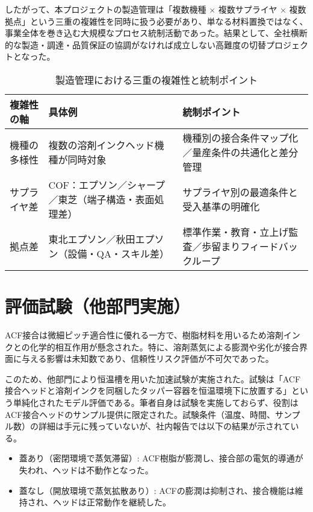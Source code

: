 \documentclass[conference]{IEEEtran}
\begin{document}
したがって、本プロジェクトの製造管理は「複数機種 × 複数サプライヤ × 複数拠点」という三重の複雑性を同時に扱う必要があり、単なる材料置換ではなく、事業全体を巻き込む大規模なプロセス統制活動であった。結果として、全社横断的な製造・調達・品質保証の協調がなければ成立しない高難度の切替プロジェクトとなった。

\begin{table}[t]
\centering
\footnotesize
\caption{製造管理における三重の複雑性と統制ポイント}
\label{tab:complexity}
\renewcommand{\arraystretch}{1.1}
\begin{tabularx}{\columnwidth}{@{}p{2.4cm} Y Y@{}}
\toprule
複雑性の軸 & 具体例 & 統制ポイント \\
\midrule
機種の多様性 &
複数の溶剤インクヘッド機種が同時対象 &
機種別の接合条件マップ化／量産条件の共通化と差分管理 \\
\addlinespace[2pt]
サプライヤ差 &
COF：エプソン／シャープ／東芝（端子構造・表面処理差） &
サプライヤ別の最適条件と受入基準の明確化 \\
\addlinespace[2pt]
拠点差 &
東北エプソン／秋田エプソン（設備・QA・スキル差） &
標準作業・教育・立上げ監査／歩留まりフィードバックループ \\
\bottomrule
\end{tabularx}
\end{table}

\section{評価試験（他部門実施）}
ACF接合は微細ピッチ適合性に優れる一方で、樹脂材料を用いるため溶剤インクとの化学的相互作用が懸念された。特に、溶剤蒸気による膨潤や劣化が接合界面に与える影響は未知数であり、信頼性リスク評価が不可欠であった。  

このため、他部門により恒温槽を用いた加速試験が実施された。試験は「ACF接合ヘッドと溶剤インクを同梱したタッパー容器を恒温環境下に放置する」という単純化されたモデル評価である。筆者自身は試験を実施しておらず、役割はACF接合ヘッドのサンプル提供に限定された。試験条件（温度、時間、サンプル数）の詳細は手元に残っていないが、社内報告では以下の結果が示されている。

\begin{itemize}
 \item 蓋あり（密閉環境で蒸気滞留）: ACF樹脂が膨潤し、接合部の電気的導通が失われ、ヘッドは不動作となった。
 \item 蓋なし（開放環境で蒸気拡散あり）: ACFの膨潤は抑制され、接合機能は維持され、ヘッドは正常動作を継続した。
\end{itemize}
\end{document}
